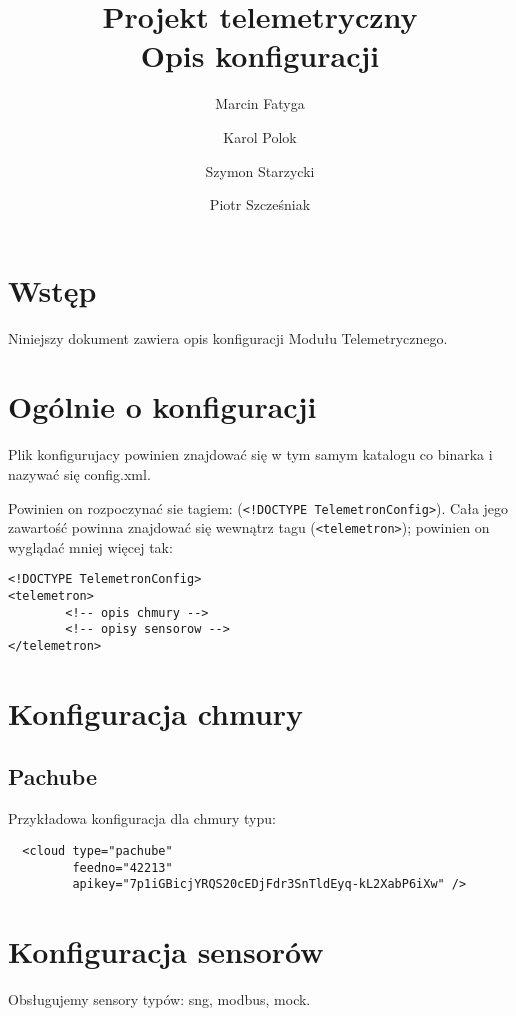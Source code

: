 \documentclass[11pt]{article}
\title{Projekt telemetryczny \\ Opis konfiguracji}
\author{Marcin Fatyga \and Karol Polok \and Szymon Starzycki \and Piotr Szcześniak}
\begin{document}
\begin{titlepage}

\maketitle

\thispagestyle{empty}
\end{titlepage}

\tableofcontents

\newpage

\section{Wstęp}
Niniejszy dokument zawiera opis konfiguracji Modułu Telemetrycznego.

\section{Ogólnie o konfiguracji}
Plik konfigurujacy powinien znajdować się w tym samym katalogu co binarka i nazywać się config.xml.

Powinien on rozpoczynać sie tagiem: (\verb|<!DOCTYPE TelemetronConfig>|). Cała jego zawartość powinna znajdować się wewnątrz tagu (\verb|<telemetron>|); powinien on wyglądać mniej więcej tak:
\begin{verbatim}
<!DOCTYPE TelemetronConfig>
<telemetron>
        <!-- opis chmury -->
        <!-- opisy sensorow -->
</telemetron>
\end{verbatim}



\section{Konfiguracja chmury}

\subsection{Pachube}

Przykładowa konfiguracja dla chmury typu:
\begin{verbatim}
  <cloud type="pachube" 
         feedno="42213" 
         apikey="7p1iGBicjYRQS20cEDjFdr3SnTldEyq-kL2XabP6iXw" />
\end{verbatim}



\section{Konfiguracja sensorów}
Obsługujemy sensory typów: sng, modbus, mock.
\end{document}
